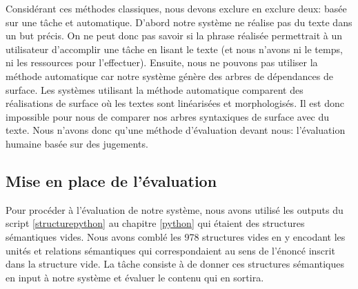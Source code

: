 Considérant ces méthodes classiques, nous devons exclure en exclure deux: basée sur une tâche et automatique. D'abord notre système ne réalise pas du texte dans un but précis. On ne peut donc pas savoir si la phrase réalisée permettrait à un utilisateur d'accomplir une tâche en lisant le texte (et nous n'avons ni le temps, ni les ressources pour l'effectuer). Ensuite, nous ne pouvons pas utiliser la méthode automatique car notre système génère des arbres de dépendances de surface. Les systèmes utilisant la méthode automatique comparent des réalisations de surface où les textes sont linéarisées et morphologisés. Il est donc impossible pour nous de comparer nos arbres syntaxiques de surface avec du texte. Nous n'avons donc qu'une méthode d'évaluation devant nous: l'évaluation humaine basée sur des jugements.

\subsection{Mise en place de l'évaluation}
Pour procéder à l'évaluation de notre système, nous avons utilisé les outputs du script \ref{structurepython} au chapitre \ref{python} qui étaient des structures sémantiques vides.  Nous avons comblé les 978 structures vides en y encodant les unités et relations sémantiques qui correspondaient au sens de l'énoncé inscrit dans la structure vide. La tâche consiste à de donner ces structures sémantiques en input à notre système et évaluer le contenu qui en sortira.

